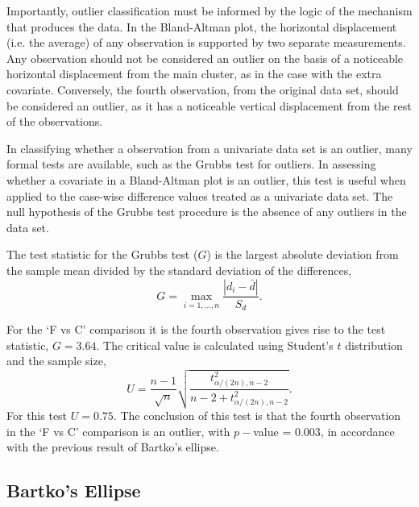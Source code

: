 \documentclass[12pt, a4paper]{report}
\theoremstyle{plain}
\theoremstyle{definition}
\theoremstyle{remark}
\begin{document}
Importantly, outlier classification must be informed by the logic of the
mechanism that produces the data. In the Bland-Altman plot, the horizontal displacement (i.e. the average) of any
observation is supported by two separate measurements. Any
observation should not be considered an outlier on the basis of a
noticeable horizontal displacement from the main cluster, as in
the case with the extra covariate. Conversely, the fourth
observation, from the original data set, should be considered an
outlier, as it has a noticeable vertical displacement from the
rest of the observations.


In classifying whether a observation from a univariate data set is
an outlier, many formal tests are available, such as the Grubbs test for outliers. In assessing
whether a covariate in a Bland-Altman plot is an outlier, this
test is useful when applied to the case-wise difference values treated as a
univariate data set. The null hypothesis of the Grubbs test procedure is the absence
of any outliers in the data set. 

The test statistic for the Grubbs test ($G$) is the largest
absolute deviation from the sample mean divided by the standard
deviation of the differences,
\begin{equation}
G =  \displaystyle\max_{i=1,\ldots, n}\frac{\left \vert d_i -
	\bar{d}\right\vert}{S_{d}}.
\end{equation}

For the `F vs C' comparison it is the fourth observation gives
rise to the test statistic, $G = 3.64$. The critical value is
calculated using Student's $t$ distribution and the sample size,
\[
U = \frac{n-1}{\sqrt{n}} \sqrt{\frac{t_{\alpha/(2n),n-2}^2}{n - 2
		+ t_{\alpha/(2n),n-2}^2}}.
\]
For this test $U = 0.75$. The conclusion of this test is that the fourth observation in the `F vs C' comparison is an outlier, with $p-$value = 0.003, in accordance with the previous result of Bartko's ellipse.




\subsection{Bartko's Ellipse}
\end{document}

